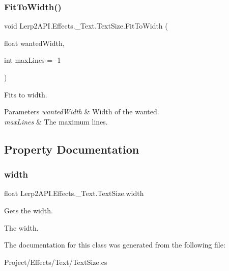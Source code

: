 \subsubsection{\texorpdfstring{Fit\+To\+Width()}{FitToWidth()}}
{\footnotesize\ttfamily void Lerp2\+A\+P\+I.\+Effects.\+\_\+\+Text.\+Text\+Size.\+Fit\+To\+Width (\begin{DoxyParamCaption}\item[{float}]{wanted\+Width,  }\item[{int}]{max\+Lines = {\ttfamily -\/1} }\end{DoxyParamCaption})\hspace{0.3cm}{\ttfamily [inline]}}



Fits to width. 


\begin{DoxyParams}{Parameters}
{\em wanted\+Width} & Width of the wanted.\\
\hline
{\em max\+Lines} & The maximum lines.\\
\hline
\end{DoxyParams}


\subsection{Property Documentation}
\mbox{\label{class_lerp2_a_p_i_1_1_effects_1_1___text_1_1_text_size_a6b1f559c98135440756b77e91def5f09}} 
\subsubsection{\texorpdfstring{width}{width}}
{\footnotesize\ttfamily float Lerp2\+A\+P\+I.\+Effects.\+\_\+\+Text.\+Text\+Size.\+width\hspace{0.3cm}{\ttfamily [get]}}



Gets the width. 

The width.

The documentation for this class was generated from the following file\+:\begin{DoxyCompactItemize}
\item 
Project/\+Effects/\+Text/Text\+Size.\+cs\end{DoxyCompactItemize}
